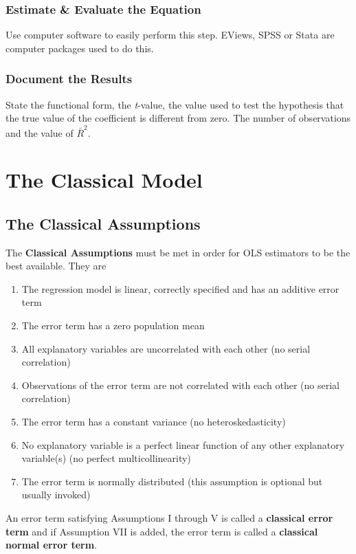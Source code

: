 \documentclass[11pt]{article}
\begin{document}
\subsubsection{Estimate \& Evaluate the Equation}
Use computer software to easily perform this step. EViews, SPSS or Stata are computer packages used to do this. 
\subsubsection{Document the Results}
State the functional form, the \textit{t}-value, the value used to test the hypothesis that the true value of the coefficient is different from zero. The number of observations and the value of $\bar{R}^2$.
\clearpage
\section{The Classical Model}
\subsection{The Classical Assumptions}
The \textbf{Classical Assumptions} must be met in order for OLS estimators to be the best available. They are
\begin{enumerate}
\item The regression model is linear, correctly specified and has an additive error term
\item The error term has a zero population mean
\item All explanatory variables are uncorrelated with each other (no serial correlation)
\item Observations of the error term are not correlated with each other (no serial correlation)
\item The error term has a constant variance (no heteroskedasticity)
\item No explanatory variable is a perfect linear function of any other explanatory variable(s) (no perfect multicollinearity)
\item The error term is normally distributed (this assumption is optional but usually invoked)
\end{enumerate}
An error term satisfying Assumptions I through V is called a \textbf{classical error term} and if Assumption VII is added, the error term is called a \textbf{classical normal error term}.
\end{document}

